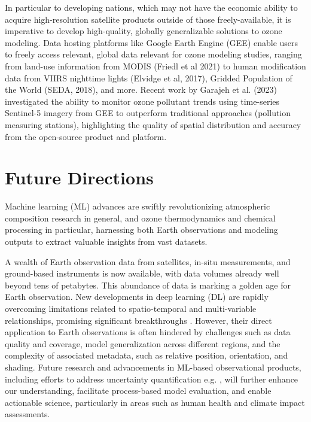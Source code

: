 \documentclass[gmd, manuscript]{copernicus}
\begin{document}
In particular to developing nations, which may not have the economic ability to acquire high-resolution satellite products outside of those freely-available, it is imperative to develop high-quality, globally generalizable solutions to ozone modeling. Data hosting platforms like Google Earth Engine (GEE) enable users to freely access relevant, global data relevant for ozone modeling studies, ranging from land-use information from MODIS (Friedl et al 2021) to human modification data from VIIRS nighttime lights (Elvidge et al, 2017), Gridded Population of the World (SEDA, 2018), and more. Recent work by Garajeh et al. (2023) investigated the ability to monitor ozone pollutant trends using time-series Sentinel-5 imagery from GEE to outperform traditional approaches (pollution measuring stations), highlighting the quality of spatial distribution and accuracy from the open-source product and platform.


\section{Future Directions}
Machine learning (ML) advances are swiftly revolutionizing atmospheric composition research in general, and ozone thermodynamics and chemical processing in particular, harnessing both Earth observations and modeling outputs to extract valuable insights from vast datasets.

A wealth of Earth observation data from satellites, in-situ measurements, and ground-based instruments is now available, with data volumes already well beyond tens of petabytes. This abundance of data is marking a golden age for Earth observation. New developments in deep learning (DL) are rapidly overcoming limitations related to spatio-temporal and multi-variable relationships, promising significant breakthroughs \citep{Eyring2024}. However, their direct application to Earth observations is often hindered by challenges such as data quality and coverage, model generalization across different regions, and the complexity of associated metadata, such as relative position, orientation, and shading. Future research and advancements in ML-based observational products, including efforts to address uncertainty quantification e.g. \citep{Haynes2023}, will further enhance our understanding, facilitate process-based model evaluation\citep{Nowack2020}, and enable actionable science, particularly in areas such as human health \citep{Fleming2018} and climate impact \citep{Gaudel2018} assessments.
\end{document}

